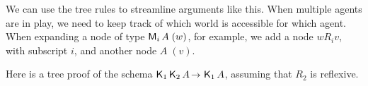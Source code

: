
We can use the tree rules to streamline arguments like this. When multiple
agents are in play, we need to keep track of which world is accessible for which
agent. When expanding a node of type $\operatorname{\mathsf{M}}_{i} A\; (w)$, for example, we add a
node $wR_{i}v$, with subscript $i$, and another node $A\; (v)$.

Here is a tree proof of the schema $\Kn_{1}\Kn_{2} A \to \Kn_{1} A$, assuming
that $R_{2}$ is reflexive. \bigskip
  \begin{center}
  \end{center}

